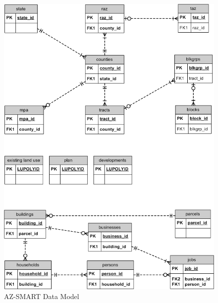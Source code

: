\begin{figure}[h]
\begin{center}
\includegraphics[scale=0.5]{figures/AZ-SMART_data_model_diagram.png}
\caption{AZ-SMART Data Model}
\label{figDataModel}
\end{center}
\end{figure}